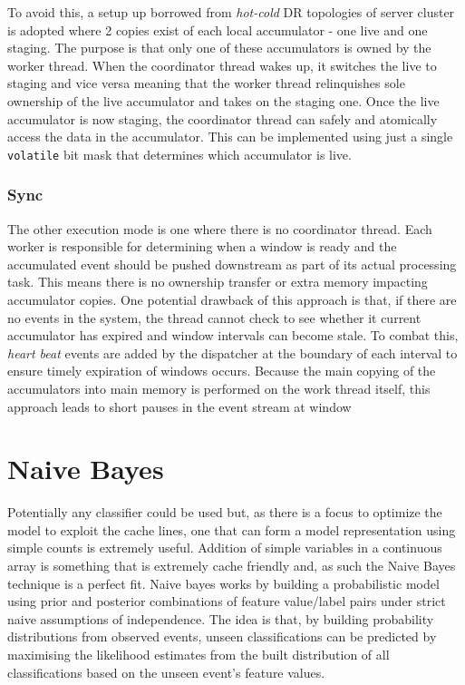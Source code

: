 \documentclass[a4paper,11pt]{scrreprt}
\begin{document}
To avoid this, a setup up borrowed from \textit{hot-cold} DR topologies of server cluster is adopted where 2 copies exist of each local accumulator - one live and one staging. The purpose is that only one of these accumulators is owned by the worker thread. When the coordinator thread wakes up, it switches the live to staging and vice versa meaning that the worker thread relinquishes sole ownership of the live accumulator and takes on the staging one. Once the live accumulator is now staging, the coordinator thread can safely and atomically access the data in the accumulator. This can be implemented using just a single \texttt{volatile} bit mask that determines which accumulator is live. 
\subsubsection{Sync}
The other execution mode is one where there is no coordinator thread. Each worker is responsible for determining when a window is ready and the accumulated event should be pushed downstream as part of its actual processing task. This means there is no ownership transfer or extra memory impacting accumulator copies. One potential drawback of this approach is that, if there are no events in the system, the thread cannot check to see whether it current accumulator has expired and window intervals can become stale. To combat this, \textit{heart beat} events are added by the dispatcher at the boundary of each interval to ensure timely expiration of windows occurs. Because the main copying of the accumulators into main memory is performed on the work thread itself, this approach leads to short pauses in the event stream at window  
\section{Naive Bayes}
Potentially any classifier could be used but, as there is a focus to optimize the model to exploit the cache lines, one that can form a model representation using simple counts is extremely useful. Addition of simple variables in a continuous array is something that is extremely cache friendly and, as such the Naive Bayes technique is a perfect fit. Naive bayes works by building a probabilistic model using prior and posterior combinations of feature value/label pairs under strict naive assumptions of independence. The idea is that, by building probability distributions from observed events, unseen classifications can be predicted by maximising the likelihood estimates from the built distribution of all classifications based on the unseen event's feature values. 
\end{document}
